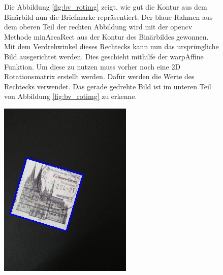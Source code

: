 \documentclass[12pt,toc=bib,toc=listof]{scrreprt}
\begin{document}
\begin{figure}[h]
\begin{minipage}[t]{.75\linewidth}

Die Abbildung \ref{fig:bv_rotimg} zeigt, wie gut die Kontur aus dem Binärbild nun die Briefmarke repräsentiert. Der blaue Rahmen aus dem oberen Teil der rechten Abbildung wird mit der opencv Methode minAreaRect aus der Kontur des Binärbildes gewonnen. Mit dem Verdrehwinkel dieses Rechtecks kann nun das ursprüngliche Bild ausgerichtet werden. Dies geschieht mithilfe der warpAffine Funktion. Um diese zu nutzen muss vorher noch eine 2D Rotationsmatrix erstellt werden. Dafür werden die Werte des Rechtecks verwendet. Das gerade gedrehte Bild ist im unteren Teil von Abbildung \ref{fig:bv_rotimg} zu erkenne.
\end{minipage}
\hfill
\begin{minipage}[t]{.2\linewidth}
  \strut\vspace*{-\baselineskip}\newline\includegraphics[width=\linewidth]{./../bilder/minarearect_dom}

\end{minipage}
\end{figure}
\end{document}
